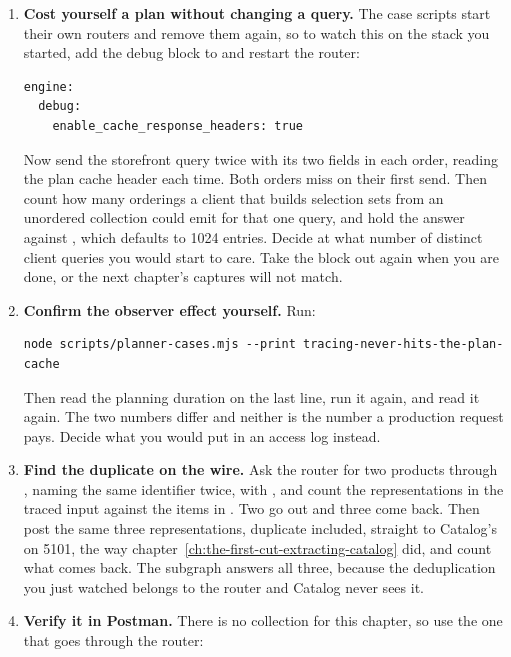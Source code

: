 \begin{enumerate}
  \item \textbf{Cost yourself a plan without changing a query.} The case
  scripts start their own routers and remove them again, so to watch this on the
  stack you started, add the debug block to  and
  restart the router:

  \begin{verbatim}
engine:
  debug:
    enable_cache_response_headers: true
  \end{verbatim}

  Now send the storefront query twice with its two fields in each order, reading
  the plan cache header each time. Both orders miss on their first send. Then
  count how many orderings a client that builds selection sets from an unordered
  collection could emit for that one query, and hold the answer against
  , which defaults to 1024 entries. Decide at
  what number of distinct client queries you would start to care. Take the block
  out again when you are done, or the next chapter's captures will not match.

  \item \textbf{Confirm the observer effect yourself.} Run:

  \begin{verbatim}
node scripts/planner-cases.mjs --print tracing-never-hits-the-plan-cache
  \end{verbatim}

  Then read the planning duration on the last line, run it again, and read it
  again. The two numbers differ and neither is the number a production request
  pays. Decide what you would put in an access log instead.

  \item \textbf{Find the duplicate on the wire.} Ask the router for two products
  through , naming the same identifier twice, with
  , and count the representations in the traced input
  against the items in . Two go out and three come back. Then post
  the same three representations, duplicate included, straight to Catalog's
   on 5101, the way
  chapter~\ref{ch:the-first-cut-extracting-catalog} did, and count what comes
  back. The subgraph answers all three, because the deduplication you just
  watched belongs to the router and Catalog never sees it.

  \item \textbf{Verify it in Postman.} There is no collection for this chapter,
  so use the one that goes through the router:


\end{enumerate}
